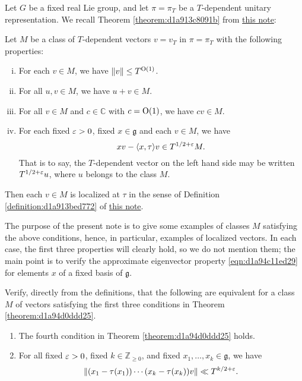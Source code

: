 \documentclass[reqno]{amsart} 
\numberwithin{equation}{section}
\begin{document}
Let $G$ be a fixed real Lie group, and let $\pi = \pi_T$ be a $T$-dependent unitary representation.  We recall Theorem \ref{theorem:d1a913c8091b} from \href{20230522T150333__microlocal-localized-vectors.pdf}{this note}:
\begin{theorem}\label{theorem:d1a94d0ddd25}
  Let $M$ be a class of $T$-dependent vectors $v = v_T$ in $\pi = \pi_T$ with the following properties:
  \begin{enumerate}[(i)]
  \item For each $v \in M$, we have $\lVert v \rVert \leq T^{\operatorname{O}(1)}$.
  \item For all $u, v \in M$, we have $u + v \in M$.
  \item For all $v \in M$ and $c \in \mathbb{C}$ with $c = \operatorname{O}(1)$, we have $c v \in M$.
  \item For each fixed $\varepsilon > 0$, fixed $x \in \mathfrak{g}$ and each $v \in M$, we have
    \begin{equation}\label{eqn:d1a94c11ed29}
      x v - \langle x, \tau  \rangle v \in T^{1/2+\varepsilon} M.
    \end{equation}
    That is to say, the $T$-dependent vector on the left hand side may be written $T^{1/2+\varepsilon} u$, where $u$ belongs to the class $M$.
  \end{enumerate}
  Then each $v \in M$ is localized at $\tau$ in the sense of Definition \ref{definition:d1a913bed772} of \href{20230522T150333__microlocal-localized-vectors.pdf}{this note}.
\end{theorem}

The purpose of the present note is to give some examples of classes $M$ satisfying the above conditions, hence, in particular, examples of localized vectors.  In each case, the first three properties will clearly hold, so we do not mention them; the main point is to verify the approximate eigenvector property \eqref{eqn:d1a94c11ed29} for elements $x$ of a fixed basis of $\mathfrak{g}$.


\begin{exercise}
  Verify, directly from the definitions, that the following are equivalent for a class $M$ of vectors satisfying the first three conditions in Theorem \ref{theorem:d1a94d0ddd25}.
  \begin{enumerate}
\item The fourth condition in Theorem \ref{theorem:d1a94d0ddd25} holds.
\item For all fixed $\varepsilon > 0$, fixed $k \in \mathbb{Z}_{\geq 0}$, and fixed $x_1,\dotsc,x_k \in \mathfrak{g}$, we have
  \begin{equation*}
\lVert (x_1 - \tau(x_1)) \dotsb (x_k - \tau(x_k)) v \rVert \ll T^{k/2 + \varepsilon }.
\end{equation*}
\end{enumerate}
\end{exercise}
\end{document}
